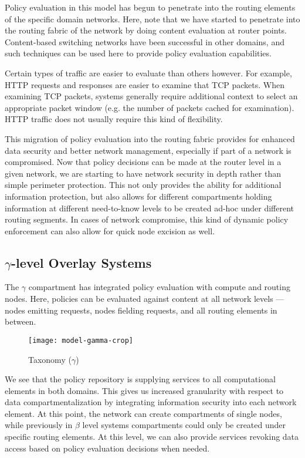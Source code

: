 Policy evaluation in this model has begun to penetrate into the routing elements of the specific domain networks.  Here, note that we have started to penetrate into the routing fabric of the network by doing content evaluation at router points.  Content-based switching networks have been successful in other domains, and such techniques can be used here to provide policy evaluation capabilities.  

Certain types of traffic are easier to evaluate than others however.  For example, HTTP requests and responses are easier to examine that TCP packets.  When examining TCP packets, systems generally require additional context to select an appropriate packet window (e.g. the number of packets cached for examination).  HTTP traffic does not usually require this kind of flexibility.

This migration of policy evaluation into the routing fabric provides for enhanced data security and better network management, especially if part of a network is compromised.  Now that policy decisions can be made at the router level in a given network, we are starting to have network security in depth rather than simple perimeter protection.  This not only provides the ability for additional information protection, but also allows for different compartments holding information at different need-to-know levels to be created ad-hoc under different routing segments.  In cases of network compromise, this kind of dynamic policy enforcement can also allow for quick node excision as well.

\subsection{$\gamma$-level Overlay Systems}
The $\gamma$ compartment has integrated policy evaluation with compute and routing nodes.  Here, policies can be evaluated against content at all network levels --- nodes emitting requests, nodes fielding requests, and all routing elements in between.

\begin{figure}[!t]
\centering
\texttt{[image: model-gamma-crop]}
\caption{Taxonomy ($\gamma$)}
\label{fig:model:taxonomy-gamma}
\end{figure}

We see that the policy repository is supplying services to all computational elements in both domains.  This gives us increased granularity with respect to data compartmentalization by integrating information security into each network element.  At this point, the network can create compartments of single nodes, while previously in $\beta$ level systems compartments could only be created under specific routing elements.  At this level, we can also provide services revoking data access based on policy evaluation decisions when needed.

